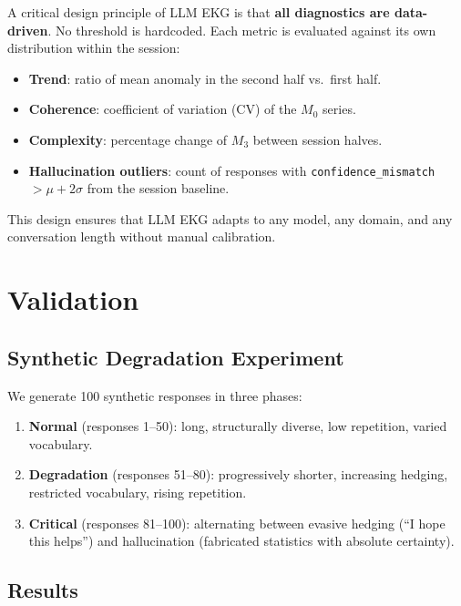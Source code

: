 \documentclass[11pt,a4paper]{article}
\begin{document}
A critical design principle of LLM EKG is that \textbf{all diagnostics are data-driven}. No threshold is hardcoded. Each metric is evaluated against its own distribution within the session:

\begin{itemize}[nosep]
    \item \textbf{Trend}: ratio of mean anomaly in the second half vs.\ first half.
    \item \textbf{Coherence}: coefficient of variation (CV) of the $M_0$ series.
    \item \textbf{Complexity}: percentage change of $M_3$ between session halves.
    \item \textbf{Hallucination outliers}: count of responses with \texttt{confidence\_mismatch} $> \mu + 2\sigma$ from the session baseline.
\end{itemize}

This design ensures that LLM EKG adapts to any model, any domain, and any conversation length without manual calibration.

\section{Validation}

\subsection{Synthetic Degradation Experiment}

We generate 100 synthetic responses in three phases:

\begin{enumerate}[nosep]
    \item \textbf{Normal} (responses 1--50): long, structurally diverse, low repetition, varied vocabulary.
    \item \textbf{Degradation} (responses 51--80): progressively shorter, increasing hedging, restricted vocabulary, rising repetition.
    \item \textbf{Critical} (responses 81--100): alternating between evasive hedging (``I hope this helps'') and hallucination (fabricated statistics with absolute certainty).
\end{enumerate}

\subsection{Results}
\end{document}

